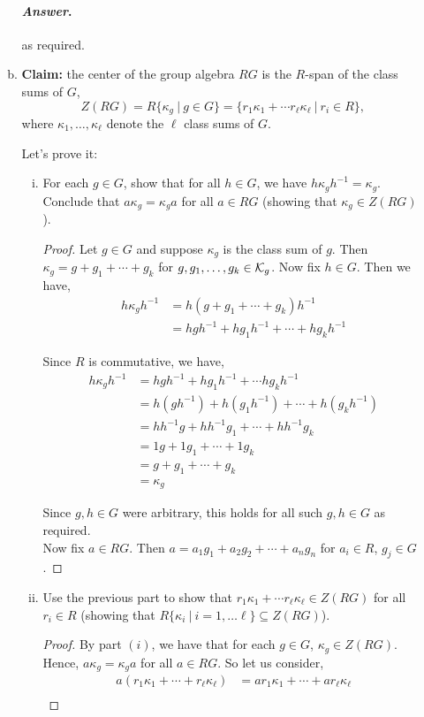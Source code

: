 \documentclass[11pt, reqno]{amsart}
\theoremstyle{plain}
\theoremstyle{definition}
\theoremstyle{example}
\newenvironment{ans}{\medskip \paragraph*{\emph{Answer}.}}{\hfill \break  $~\!\!$ \dotfill \medskip }
\begin{document}
\begin{enumerate}[1.]
\begin{enumerate}[(a)]
\begin{ans}
as required.
\end{ans}

\item \textbf{Claim:} the center of the group algebra $RG$ is the $R$-span of the class sums of $G$,
$$Z(RG) = R\{\kappa_g ~|~ g \in G\}  = \{ r_1 \kappa_1 + \cdots r_\ell \kappa_\ell ~|~ r _i \in R\},$$
where $\kappa_1, \dots, \kappa_\ell$ denote the $\ell$ class sums of $G$. 

Let's prove it:
\begin{enumerate}[(i)]
\item For each $g \in G$, show  that for all $h \in G$, we have $h \kappa_g h^{-1} = \kappa_g$. Conclude that $a \kappa_g = \kappa_g a$ for all $a \in RG$ (showing that $\kappa_g \in Z(RG)$). 

\begin{proof}
Let $g \in G$ and suppose $\kappa_g$ is the class sum of $g$. Then $\kappa_g = g + g_1 + \cdots + g_k$ for $g, g_1, \ldots, g_k \in \mathcal{K}_g$. Now fix $h \in G$. Then we have,
\begin{align*}
h\kappa_gh^{-1} &= h(g + g_1 + \cdots + g_k)h^{-1}\\
&= hgh^{-1} + hg_1h^{-1} + \cdots + hg_kh^{-1}
\end{align*}

Since $R$ is commutative, we have,
\begin{align*}
h\kappa_gh^{-1} &= hgh^{-1} + hg_1h^{-1} + \cdots hg_kh^{-1}\\
&= h(gh^{-1}) + h(g_1h^{-1}) + \cdots + h(g_kh^{-1})\\
&= hh^{-1}g + hh^{-1}g_1 + \cdots + hh^{-1}g_k\\
&= 1g + 1g_1 + \cdots + 1g_k\\
&= g + g_1 + \cdots + g_k\\
&= \kappa_g
\end{align*}

Since $g, h \in G$ were arbitrary, this holds for all such $g, h \in G$ as required.\\

Now fix $a \in RG$. Then $a = a_1g_1 + a_2g_2 + \cdots + a_ng_n$ for $a_i \in R$, $g_j \in G$.
\end{proof}

\item Use the previous part to show that $r_1 \kappa_1 + \cdots r_\ell \kappa_\ell \in  Z(RG)$ for all $r_i \in R$ (showing that $R\{\kappa_i ~|~ i = 1, \dots \ell\} \subseteq Z(RG)$). 

\begin{proof}
By part $(i)$, we have that for each $g \in G$, $\kappa_g \in Z(RG)$. Hence, $a\kappa_g = \kappa_g a$ for all $a \in RG$. So let us consider,
\begin{align*}
a(r_1\kappa_1 + \cdots + r_{\ell}\kappa_{\ell}) &= ar_1\kappa_1 + \cdots + ar_{\ell}\kappa_{\ell}\\
\end{align*}


\end{proof}
\end{enumerate}
\end{enumerate}
\end{enumerate}
\end{document}
